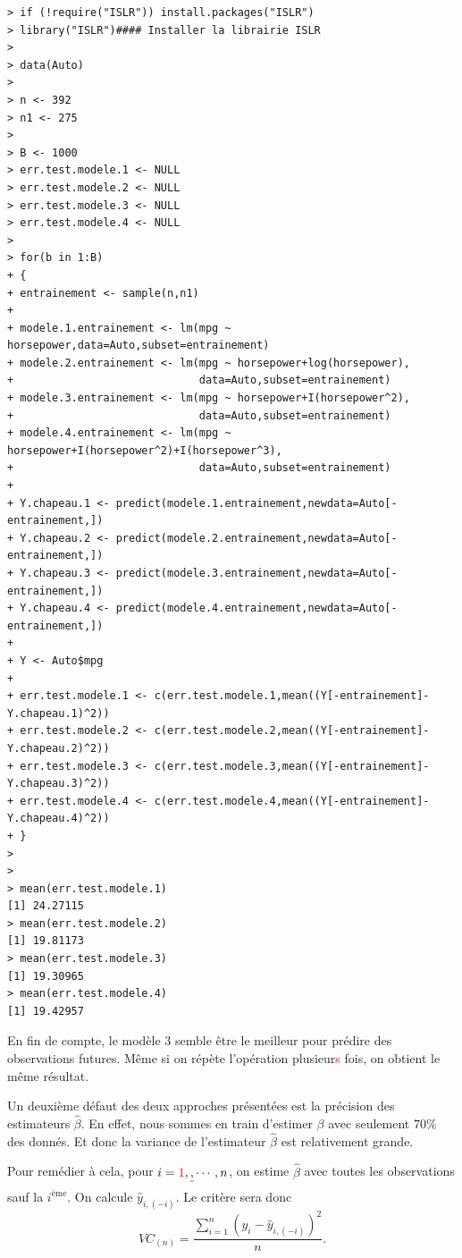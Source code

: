 \documentclass[11pt]{article}
\begin{document}
\begin{verbatim}
> if (!require("ISLR")) install.packages("ISLR")
> library("ISLR")#### Installer la librairie ISLR
> 
> data(Auto)
> 
> n <- 392
> n1 <- 275
> 
> B <- 1000
> err.test.modele.1 <- NULL
> err.test.modele.2 <- NULL
> err.test.modele.3 <- NULL
> err.test.modele.4 <- NULL
> 
> for(b in 1:B)
+ {
+ entrainement <- sample(n,n1)
+ 
+ modele.1.entrainement <- lm(mpg ~ horsepower,data=Auto,subset=entrainement)
+ modele.2.entrainement <- lm(mpg ~ horsepower+log(horsepower),
+                             data=Auto,subset=entrainement)
+ modele.3.entrainement <- lm(mpg ~ horsepower+I(horsepower^2),
+                             data=Auto,subset=entrainement)
+ modele.4.entrainement <- lm(mpg ~ horsepower+I(horsepower^2)+I(horsepower^3),
+                             data=Auto,subset=entrainement)
+ 
+ Y.chapeau.1 <- predict(modele.1.entrainement,newdata=Auto[-entrainement,])
+ Y.chapeau.2 <- predict(modele.2.entrainement,newdata=Auto[-entrainement,])
+ Y.chapeau.3 <- predict(modele.3.entrainement,newdata=Auto[-entrainement,])
+ Y.chapeau.4 <- predict(modele.4.entrainement,newdata=Auto[-entrainement,])
+ 
+ Y <- Auto$mpg
+ 
+ err.test.modele.1 <- c(err.test.modele.1,mean((Y[-entrainement]-Y.chapeau.1)^2)) 
+ err.test.modele.2 <- c(err.test.modele.2,mean((Y[-entrainement]-Y.chapeau.2)^2)) 
+ err.test.modele.3 <- c(err.test.modele.3,mean((Y[-entrainement]-Y.chapeau.3)^2)) 
+ err.test.modele.4 <- c(err.test.modele.4,mean((Y[-entrainement]-Y.chapeau.4)^2)) 
+ }
> 
> 
> mean(err.test.modele.1)
[1] 24.27115
> mean(err.test.modele.2)
[1] 19.81173
> mean(err.test.modele.3)
[1] 19.30965
> mean(err.test.modele.4)
[1] 19.42957
\end{verbatim}

\noindent En fin de compte, le mod\`ele 3 semble \^etre le meilleur pour pr\'edire des observations futures. M\^eme si on r\'ep\`ete l'op\'eration plusieur\textcolor{red}{s} fois, on obtient le m\^eme r\'esultat.

\noindent Un deuxi\`eme d\'efaut des deux approches pr\'esent\'ees est la pr\'ecision des estimateurs $\hat \beta$. En effet, nous sommes en train d'estimer $\beta$ avec seulement $70\%$ des donn\'es. Et donc la variance de l'estimateur $\hat\beta$ est relativement grande. 

\noindent Pour rem\'edier \`a cela, pour $i=\textcolor{red}{1},\sout{,}\cdots,n$, on estime $\hat\beta$ avec toutes les observations sauf la $i^{\mbox{\`eme}}$. On calcule $\hat y_{i,(-i)}$. Le crit\`ere sera donc $$VC_{(n)} = \frac{\sum\limits_{i=1}^n (y_i-\hat y_{i,(-i)})^2}{n}.$$
\end{document}
